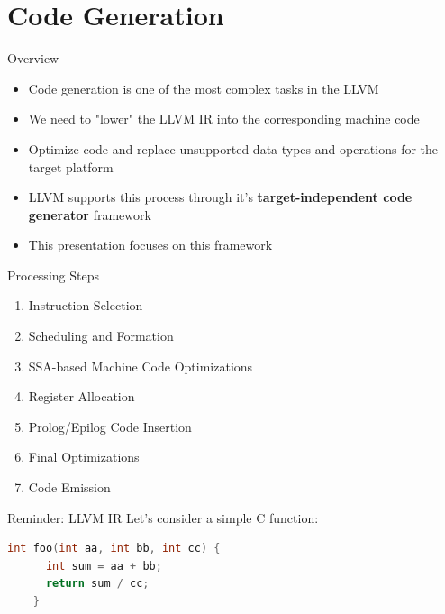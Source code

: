 \documentclass[]{beamer}
\begin{document}
\section{Code Generation}

\begin{frame}{Overview}
  \begin{itemize}
    \item Code generation is one of the most complex tasks in the LLVM
    \item We need to "lower" the LLVM IR into the corresponding machine code
    \item Optimize code and replace unsupported data types and operations for the target platform
    \item LLVM supports this process through it's \textbf{target-independent code generator} framework
    \item This presentation focuses on this framework
  \end{itemize}
\end{frame}

\begin{frame}{Processing Steps}
  \begin{enumerate}
    \item Instruction Selection
    \item Scheduling and Formation
    \item SSA-based Machine Code Optimizations
    \item Register Allocation
    \item Prolog/Epilog Code Insertion
    \item Final Optimizations
    \item Code Emission
  \end{enumerate}
\end{frame}


\begin{frame}[fragile]{Reminder: LLVM IR}
  \vfill
  Let's consider a simple C function:
  \begin{lstlisting}[language=C,gobble=4]
    int foo(int aa, int bb, int cc) {
      int sum = aa + bb;
      return sum / cc;
    }
  \end{lstlisting}
  \vfill
\end{frame}
\end{document}
